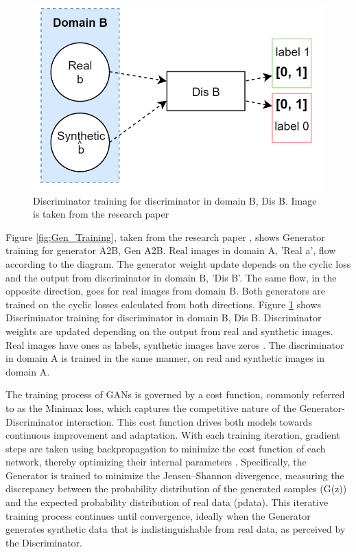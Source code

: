 \documentclass[UKenglish,12pt]{master-style}
\begin{document}
\begin{figure}[ht]
    \centering
    \includegraphics[width=1\textwidth]{Images/Disc_Training.png}
    \caption{Discriminator training for discriminator in domain B, Dis B. Image is taken from the research paper \cite{MRI}}
    \label{fig:Disc_Training}
\end{figure}

Figure \ref{fig:Gen_Training}, taken from the research paper \cite{MRI}, shows Generator training for generator A2B, Gen A2B. Real images in domain A, ’Real a’, flow according to the diagram. The generator weight update depends on the cyclic loss and the output from discriminator in domain B, ’Dis B’. The same flow, in the opposite direction, goes for real images from domain B. Both generators are trained on the cyclic losses calculated from both directions. Figure \ref{fig:Disc_Training} shows Discriminator training for discriminator in domain B, Dis B. Discriminator weights are updated depending on the output from real and synthetic images. Real images have ones as labels, synthetic images have zeros \cite{MRI}. The discriminator in domain A is trained in the same manner, on real and synthetic images in domain A.

The training process of GANs is governed by a cost function, commonly referred to as the Minimax loss, which captures the competitive nature of the Generator-Discriminator interaction. This cost function drives both models towards continuous improvement and adaptation. With each training iteration, gradient steps are taken using backpropagation to minimize the cost function of each network, thereby optimizing their internal parameters \cite{electronics10212689}. Specifically, the Generator is trained to minimize the Jensen–Shannon divergence, measuring the discrepancy between the probability distribution of the generated samples (G(z)) and the expected probability distribution of real data (pdata). This iterative training process continues until convergence, ideally when the Generator generates synthetic data that is indistinguishable from real data, as perceived by the Discriminator.
\end{document}
